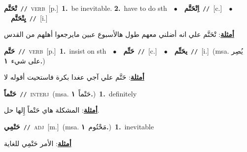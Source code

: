 \documentclass[10pt,a4paper,twoside]{article} %
\begin{document}
\begin{multicols}{2}
{\setlength\topsep{0pt}\textbf{\foreignlanguage{arabic}{تْحَتَّم}}\ {\color{gray}\texttt{//}\color{black}}\ \textsc{verb}\ [p.]\ \textbf{1.}~be inevitable.  \textbf{2.}~have to do sth\ \ $\bullet$\ \ \setlength\topsep{0pt}\textbf{\foreignlanguage{arabic}{اِتْحَتَّم}}\ {\color{gray}\texttt{//}\color{black}}\ [c.]\ \ $\bullet$\ \ \setlength\topsep{0pt}\textbf{\foreignlanguage{arabic}{يِتْحَتَّم}}\ {\color{gray}\texttt{//}\color{black}}\ [i.]\  \begin{flushright}\color{gray}\foreignlanguage{arabic}{\textbf{\underline{\foreignlanguage{arabic}{أمثلة}}}: تْحَتَّم علي انه أضلني معهم طول هالأسبوع عبين مايرجعوا أهلهم من القدس}\end{flushright}\color{black}} \vspace{2mm}

{\setlength\topsep{0pt}\textbf{\foreignlanguage{arabic}{حَتَّم}}\ {\color{gray}\texttt{//}\color{black}}\ \textsc{verb}\ [p.]\ \textbf{1.}~insist on sth\ \ $\bullet$\ \ \setlength\topsep{0pt}\textbf{\foreignlanguage{arabic}{حَتِّم}}\ {\color{gray}\texttt{//}\color{black}}\ [c.]\ \ $\bullet$\ \ \setlength\topsep{0pt}\textbf{\foreignlanguage{arabic}{يحَتِّم}}\ {\color{gray}\texttt{//}\color{black}}\ [i.]\ \color{gray}(msa. \foreignlanguage{arabic}{يُصِر على شيء}~\foreignlanguage{arabic}{\textbf{١.}})\color{black}\  \begin{flushright}\color{gray}\foreignlanguage{arabic}{\textbf{\underline{\foreignlanguage{arabic}{أمثلة}}}: حَتَّم علي آجي عغدا بكرة فاستحيت أقوله لا}\end{flushright}\color{black}} \vspace{2mm}

{\setlength\topsep{0pt}\textbf{\foreignlanguage{arabic}{حَتْماً}}\ {\color{gray}\texttt{//}\color{black}}\ \textsc{interj}\ \color{gray}(msa. \foreignlanguage{arabic}{حَتْماً}~\foreignlanguage{arabic}{\textbf{١.}})\color{black}\ \textbf{1.}~definitely\  \begin{flushright}\color{gray}\foreignlanguage{arabic}{\textbf{\underline{\foreignlanguage{arabic}{أمثلة}}}: المشكلة هاي حَتْماً إِلها حل.}\end{flushright}\color{black}} \vspace{2mm}

{\setlength\topsep{0pt}\textbf{\foreignlanguage{arabic}{حَتْمِي}}\ {\color{gray}\texttt{//}\color{black}}\ \textsc{adj}\ [m.]\ \color{gray}(msa. \foreignlanguage{arabic}{مَحْتُوم}~\foreignlanguage{arabic}{\textbf{١.}})\color{black}\ \textbf{1.}~inevitable\  \begin{flushright}\color{gray}\foreignlanguage{arabic}{\textbf{\underline{\foreignlanguage{arabic}{أمثلة}}}: الأمر حَتْمِي للغاية}\end{flushright}\color{black}} \vspace{2mm}


\end{multicols}
\end{document}
